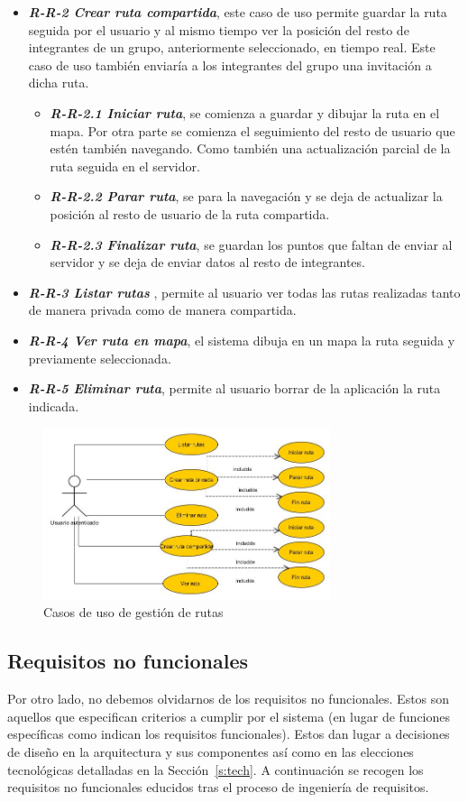 \begin{itemize}
\begin{itemize}
\item \textbf{\textit{R-R-2 Crear ruta compartida}}, este caso de uso permite guardar la ruta seguida por el usuario y al mismo tiempo ver la posición del resto de integrantes de un grupo, anteriormente seleccionado, en tiempo real. Este caso de uso también enviaría a los integrantes del grupo una invitación a dicha ruta.
\begin{itemize}
\item \textbf{\textit{R-R-2.1 Iniciar ruta}}, se comienza a guardar y dibujar la ruta en el mapa. Por otra parte se comienza el seguimiento del resto de usuario que estén también navegando. Como también una actualización parcial de la ruta seguida en el servidor.
\item \textbf{\textit{R-R-2.2 Parar ruta}}, se para la navegación y se deja de actualizar la posición al resto de usuario de la ruta compartida.
\item \textbf{\textit{R-R-2.3 Finalizar ruta}}, se guardan los puntos que faltan de enviar al servidor y se deja de enviar datos al resto de integrantes.
\end{itemize}
\item \textbf{\textit{R-R-3 Listar rutas} }, permite al usuario ver todas las rutas realizadas tanto de manera privada como de manera compartida.
\item \textbf{\textit{R-R-4 Ver ruta en mapa}}, el sistema dibuja en un mapa la ruta seguida y previamente seleccionada.
\item \textbf{\textit{R-R-5 Eliminar ruta}}, permite al usuario borrar de la aplicación la ruta indicada.
\end{itemize} 
\end{itemize}
\begin{figure}[H]
		\centering
		\includegraphics[width=0.75\textwidth] {rutas.jpg}
		\caption{Casos de uso de gestión de rutas }
	\end{figure}
\subsection{Requisitos no funcionales}
Por otro lado, no debemos olvidarnos de los requisitos no funcionales. Estos son aquellos que especifican criterios a cumplir por el sistema (en lugar de funciones específicas como indican los requisitos funcionales). Estos dan lugar a decisiones de diseño en la arquitectura y sus componentes así como en las elecciones tecnológicas detalladas en la Sección~\ref{s:tech}. A continuación se recogen los requisitos no funcionales educidos tras el proceso de ingeniería de requisitos.

